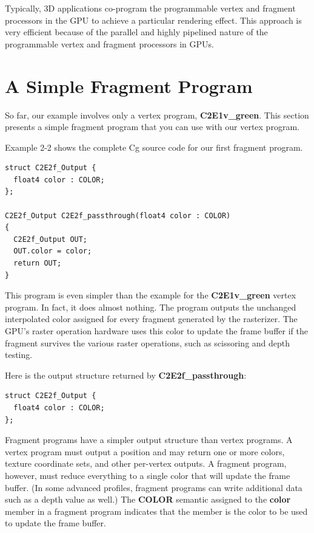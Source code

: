 \documentclass{book}
\begin{document}
Typically, 3D applications co-program the programmable vertex and fragment processors in the GPU to achieve a particular rendering effect. This approach is very efficient because of the parallel and highly pipelined nature of the programmable vertex and fragment processors in GPUs.

\section{A Simple Fragment Program}

So far, our example involves only a vertex program, \textbf{C2E1v_green}. This section presents a simple fragment program that you can use with our vertex program.

Example 2-2 shows the complete Cg source code for our first fragment program.

\FloatBarrier
\begin{lstlisting}[caption=Example 2-2. The \textbf{C2E2f_passthrough} Fragment Program]
struct C2E2f_Output {
  float4 color : COLOR;
};

C2E2f_Output C2E2f_passthrough(float4 color : COLOR)
{
  C2E2f_Output OUT;
  OUT.color = color;
  return OUT;
}
\end{lstlisting}
\FloatBarrier

This program is even simpler than the example for the \textbf{C2E1v_green} vertex program. In fact, it does almost nothing. The program outputs the unchanged interpolated color assigned for every fragment generated by the rasterizer. The GPU's raster operation hardware uses this color to update the frame buffer if the fragment survives the various raster operations, such as scissoring and depth testing.

Here is the output structure returned by \textbf{C2E2f_passthrough}:

\FloatBarrier
\begin{lstlisting}
struct C2E2f_Output {
  float4 color : COLOR;
};
\end{lstlisting}
\FloatBarrier

Fragment programs have a simpler output structure than vertex programs. A vertex program must output a position and may return one or more colors, texture coordinate sets, and other per-vertex outputs. A fragment program, however, must reduce everything to a single color that will update the frame buffer. (In some advanced profiles, fragment programs can write additional data such as a depth value as well.) The \textbf{COLOR} semantic assigned to the \textbf{color} member in a fragment program indicates that the member is the color to be used to update the frame buffer.
\end{document}
